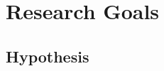\section{Research Goals}
\begin{comment}
- Investigate related system

- Requirement analysis

- Conceptual design of an interactive feedback system for slacklining

- User interface design

- Integration

- Investigation of the system
\end{comment}
\subsection{Hypothesis}
\begin{comment}
- Provide supportive feedback

- Show if an interactive real time feedback system is usable for this kind of sport

- If the learning progress is comparable with other training methods like human trainer

- If such a system motivates user for slackline exercises
\end{comment}